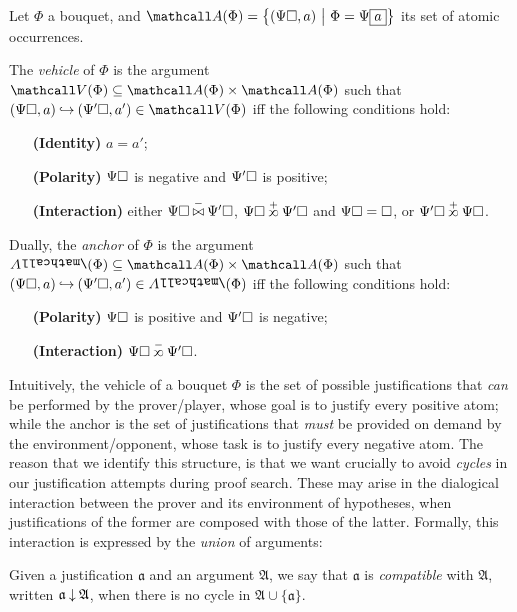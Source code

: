 \begin{definition} Let $\Phi$ a bouquet, and
  $\atomoccs{\Phi} = \compr{(\Psi\hole, a)}{\Phi = \Psi\select{a}}$ its set of
  atomic occurrences.
  
  The \emph{vehicle} of $\Phi$ is the argument $\vehicle{\Phi} \subseteq
  \atomoccs{\Phi} \times \atomoccs{\Phi}$ such that $(\Psi\hole, a) \justi
  (\Psi'\hole, a') \in \vehicle{\Phi}$ iff the following conditions hold:
  \begin{itemize}
    \item[\textbf{(Identity)}] $a = a'$;
    \item[\textbf{(Polarity)}] $\Psi\square$ is negative and $\Psi'\square$ is
    positive;
    \item[\textbf{(Interaction)}] either $\Psi\hole \cinterneg \Psi'\hole$,
    $\Psi\hole \sinterpos \Psi'\hole$ and $\Psi\square = \square$, or $\Psi'\hole
    \sinterpos \Psi\hole$.
  \end{itemize}

  Dually, the \emph{anchor} of $\Phi$ is the argument $\anchor{\Phi} \subseteq
  \atomoccs{\Phi} \times \atomoccs{\Phi}$ such that $(\Psi\hole, a) \justi
  (\Psi'\hole, a') \in \anchor{\Phi}$ iff the following conditions hold:
  \begin{itemize}
    \item[\textbf{(Polarity)}] $\Psi\square$ is positive and $\Psi'\square$ is
    negative;
    \item[\textbf{(Interaction)}] $\Psi\hole \sinterneg \Psi'\hole$.
  \end{itemize}
\end{definition}

Intuitively, the vehicle of a bouquet $\Phi$ is the set of possible
justifications that \emph{can} be performed by the prover/player, whose goal is
to justify every positive atom; while the anchor is the set of justifications
that \emph{must} be provided on demand by the environment/opponent, whose task
is to justify every negative atom. The reason that we identify this structure,
is that we want crucially to avoid \emph{cycles} in our justification attempts
during proof search. These may arise in the dialogical interaction between the
prover and its environment of hypotheses, when justifications of the former are
composed with those of the latter. Formally, this interaction is expressed by
the \emph{union} of arguments:

\begin{definition}[Compatibility]
  Given a justification $\mathfrak{a}$ and an argument $\mathfrak{A}$, we say
  that $\mathfrak{a}$ is \emph{compatible} with $\mathfrak{A}$, written
  $\mathfrak{a} \mathbin{\downarrow} \mathfrak{A}$, when there is no cycle in $\mathfrak{A}
  \cup \{\mathfrak{a}\}$.
\end{definition}

